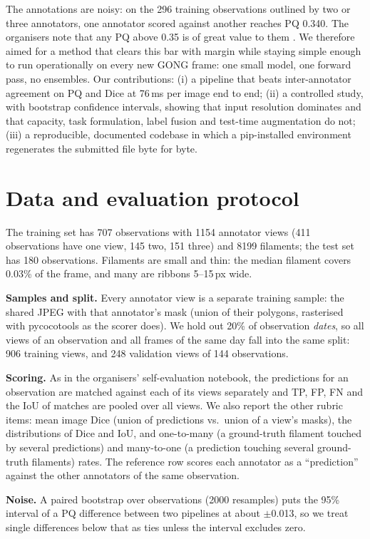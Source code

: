 \documentclass[sigconf]{acmart}
\begin{document}
The annotations are noisy: on the 296 training observations outlined by two or three annotators, one annotator scored against another reaches PQ 0.340. The organisers note that any PQ above 0.35 is of great value to them \cite{filament-segmentation-2026}. We therefore aimed for a method that clears this bar with margin while staying simple enough to run operationally on every new GONG frame: one small model, one forward pass, no ensembles. Our contributions: (i) a pipeline that beats inter-annotator agreement on PQ and Dice at 76\,ms per image end to end; (ii) a controlled study, with bootstrap confidence intervals, showing that input resolution dominates and that capacity, task formulation, label fusion and test-time augmentation do not; (iii) a reproducible, documented codebase in which a pip-installed environment regenerates the submitted file byte for byte.

\section{Data and evaluation protocol}\label{sec:protocol}
The training set has 707 observations with 1154 annotator views (411 observations have one view, 145 two, 151 three) and 8199 filaments; the test set has 180 observations. Filaments are small and thin: the median filament covers 0.03\% of the frame, and many are ribbons 5--15\,px wide.

\textbf{Samples and split.} Every annotator view is a separate training sample: the shared JPEG with that annotator's mask (union of their polygons, rasterised with pycocotools as the scorer does). We hold out 20\% of observation \emph{dates}, so all views of an observation and all frames of the same day fall into the same split: 906 training views, and 248 validation views of 144 observations.

\textbf{Scoring.} As in the organisers' self-evaluation notebook, the predictions for an observation are matched against each of its views separately and TP, FP, FN and the IoU of matches are pooled over all views. We also report the other rubric items: mean image Dice (union of predictions vs.\ union of a view's masks), the distributions of Dice and IoU, and one-to-many (a ground-truth filament touched by several predictions) and many-to-one (a prediction touching several ground-truth filaments) rates. The reference row scores each annotator as a ``prediction'' against the other annotators of the same observation.

\textbf{Noise.} A paired bootstrap over observations \cite{efron1993bootstrap} (2000 resamples) puts the 95\% interval of a PQ difference between two pipelines at about $\pm$0.013, so we treat single differences below that as ties unless the interval excludes zero.
\end{document}
